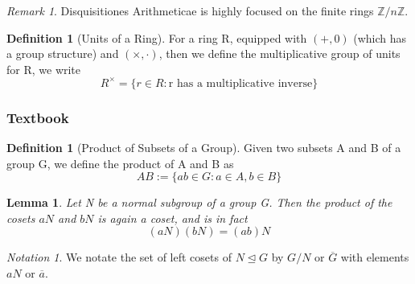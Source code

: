 \documentclass[12pt]{article}
\newtheorem{lem}[thm]{Lemma}  %
\theoremstyle{definition}
\newtheorem{defn}[thm]{Definition}
\theoremstyle{remark}
\newtheorem{rmk}[thm]{Remark}
\newtheorem{nota}[thm]{Notation}
\numberwithin{equation}{section}
\newcommand\Z{\mathbb Z}    %
\newcommand\nsub{\trianglelefteq}
\begin{document}
\vspace{15pt}

\begin{rmk}
        Disquisitiones Arithmeticae is highly focused on the finite rings $\Z/n\Z$.
\end{rmk}

\vspace{15pt}

\begin{defn}[Units of a Ring]
        For a ring R, equipped with $(+,0)$ (which has a group structure) and $(\times, \cdot)$, then we define the multiplicative group of units for R, we write \begin{equation}
                R^{\times} = \{r \in R: \text{r has a multiplicative inverse}\}
        \end{equation}
\end{defn}

\vspace{15pt}

\subsubsection{Textbook}

\begin{defn}[Product of Subsets of a Group]
        Given two subsets A and B of a group G, we define the product of A and B as \begin{equation}
                AB := \{ab \in G: a\in A, b \in B\}
        \end{equation}
\end{defn}

\vspace{15pt}

\begin{lem}
        Let N be a normal subgroup of a group G. Then the product of the cosets $aN$ and $bN$ is again a coset, and is in fact \begin{equation}
                (aN)(bN) = (ab)N
        \end{equation}
\end{lem}


\vspace{15pt}

\begin{nota}
        We notate the set of left cosets of $N \nsub G$ by $G/N$ or $\overline{G}$ with elements $aN$ or $\overline{a}$.
\end{nota}

\vspace{15pt}
\end{document}
